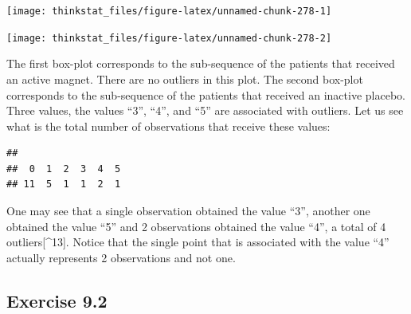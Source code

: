 \documentclass[]{krantz}
\makeatletter
\newenvironment{Shaded}{\begin{snugshade}}{\end{snugshade}}
\newcommand{\KeywordTok}[1]{\textcolor[rgb]{0.13,0.29,0.53}{\textbf{#1}}}
\newcommand{\DecValTok}[1]{\textcolor[rgb]{0.00,0.00,0.81}{#1}}
\newcommand{\OperatorTok}[1]{\textcolor[rgb]{0.81,0.36,0.00}{\textbf{#1}}}
\newcommand{\NormalTok}[1]{#1}
\newenvironment{kframe}{%
\medskip{}
\setlength{\fboxsep}{.8em}
 \def\at@end@of@kframe{}%
 \ifinner\ifhmode%
  \def\at@end@of@kframe{\end{minipage}}%
  \begin{minipage}{\columnwidth}%
 \fi\fi%
 \def\FrameCommand##1{\hskip\@totalleftmargin \hskip-\fboxsep
 \colorbox{shadecolor}{##1}\hskip-\fboxsep
     \hskip-\linewidth \hskip-\@totalleftmargin \hskip\columnwidth}%
 \MakeFramed {\advance\hsize-\width
   \@totalleftmargin\z@ \linewidth\hsize
   \@setminipage}}%
 {\par\unskip\endMakeFramed%
 \at@end@of@kframe}
\renewenvironment{Shaded}{\begin{kframe}}{\end{kframe}}
\theoremstyle{definition}
\theoremstyle{definition}
\theoremstyle{definition}
\theoremstyle{remark}
\makeatother
\begin{document}
\begin{enumerate}
  \begin{center}\texttt{[image: thinkstat\_files/figure-latex/unnamed-chunk-278-1]} \end{center}

\begin{Shaded}
\end{Shaded}

  \begin{center}\texttt{[image: thinkstat\_files/figure-latex/unnamed-chunk-278-2]} \end{center}

  The first box-plot corresponds to the sub-sequence of the patients
  that received an active magnet. There are no outliers in this plot.
  The second box-plot corresponds to the sub-sequence of the patients
  that received an inactive placebo. Three values, the values ``3'',
  ``4'', and ``5'' are associated with outliers. Let us see what is the
  total number of observations that receive these values:

\begin{Shaded}
\end{Shaded}

\begin{verbatim}
## 
##  0  1  2  3  4  5 
## 11  5  1  1  2  1
\end{verbatim}

  One may see that a single observation obtained the value ``3'',
  another one obtained the value ``5'' and 2 observations obtained the
  value ``4'', a total of 4 outliers{[}\^{}13{]}. Notice that the single
  point that is associated with the value ``4'' actually represents 2
  observations and not one.
\end{enumerate}

\subsection*{Exercise 9.2}\label{exercise-9.2}
\end{document}
